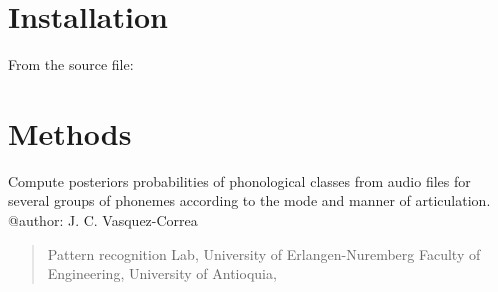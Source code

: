 \documentclass[letterpaper,10pt,english]{sphinxmanual}
\begin{document}
\chapter{Installation}
\label{\detokenize{index:installation}}
From the source file:

\begin{sphinxVerbatim}[commandchars=\\\{\}]
  
 
  
\end{sphinxVerbatim}


\chapter{Methods}
\label{\detokenize{index:module-phonet}}\label{\detokenize{index:methods}}
Compute posteriors probabilities of phonological classes from audio files for several groups of phonemes according to the mode and manner of articulation.
@author: J. C. Vasquez-Correa
\begin{quote}

Pattern recognition Lab, University of Erlangen-Nuremberg
Faculty of Engineering, University of Antioquia,
\end{quote}
\end{document}
